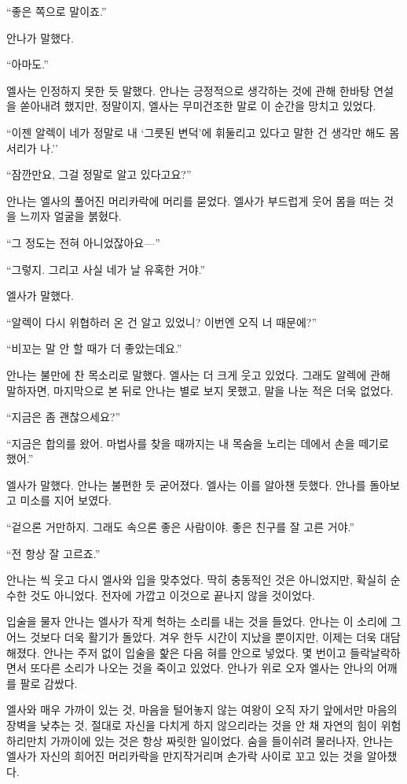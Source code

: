 ``좋은 쪽으로 말이죠.''

안나가 말했다.

``아마도.''

엘사는 인정하지 못한 듯 말했다. 안나는 긍정적으로 생각하는 것에 관해 한바탕 연설을 쏟아내려 했지만, 정말이지, 엘사는 무미건조한 말로 이 순간을 망치고 있었다.

``이젠 알렉이 네가 정말로 내 `그릇된 변덕'에 휘둘리고 있다고 말한 건 생각만 해도 몸서리가 나.''

``잠깐만요, 그걸 정말로 알고 있다고요?''

안나는 엘사의 풀어진 머리카락에 머리를 묻었다. 엘사가 부드럽게 웃어 몸을 떠는 것을 느끼자 얼굴을 붉혔다.

``그 정도는 전혀 아니었잖아요—''

``그렇지. 그리고 사실 네가 날 유혹한 거야.''

엘사가 말했다.

``알렉이 다시 위협하러 온 건 알고 있었니? 이번엔 오직 너 때문에?''

``비꼬는 말 안 할 때가 더 좋았는데요.''

안나는 불만에 찬 목소리로 말했다. 엘사는 더 크게 웃고 있었다. 그래도 알렉에 관해 말하자면, 마지막으로 본 뒤로 안나는 별로 보지 못했고, 말을 나눈 적은 더욱 없었다.

``지금은 좀 괜찮으세요?''

``지금은 합의를 왔어. 마법사를 찾을 때까지는 내 목숨을 노리는 데에서 손을 떼기로 했어.''

엘사가 말했다. 안나는 불편한 듯 굳어졌다. 엘사는 이를 알아챈 듯했다. 안나를 돌아보고 미소를 지어 보였다.

``겉으론 거만하지. 그래도 속으론 좋은 사람이야. 좋은 친구를 잘 고른 거야.''

``전 항상 잘 고르죠.''

안나는 씩 웃고 다시 엘사와 입을 맞추었다. 딱히 충동적인 것은 아니었지만, 확실히 순수한 것도 아니었다. 전자에 가깝고 이것으로 끝나지 않을 것이었다.

입술을 물자 안나는 엘사가 작게 헉하는 소리를 내는 것을 들었다. 안나는 이 소리에 그 어느 것보다 더욱 활기가 돌았다. 겨우 한두 시간이 지났을 뿐이지만, 이제는 더욱 대담해졌다. 안나는 주저 없이 입술을 핥은 다음 혀를 안으로 넣었다. 몇 번이고 들락날락하면서 또다른 소리가 나오는 것을 죽이고 있었다. 안나가 위로 오자 엘사는 안나의 어깨를 팔로 감쌌다.

엘사와 매우 가까이 있는 것, 마음을 털어놓지 않는 여왕이 오직 자기 앞에서만 마음의 장벽을 낮추는 것, 절대로 자신을 다치게 하지 않으리라는 것을 안 채 자연의 힘이 위험하리만치 가까이에 있는 것은 항상 짜릿한 일이었다. 숨을 들이쉬려 물러나자, 안나는 엘사가 자신의 희어진 머리카락을 만지작거리며 손가락 사이로 꼬고 있는 것을 알아챘다.

